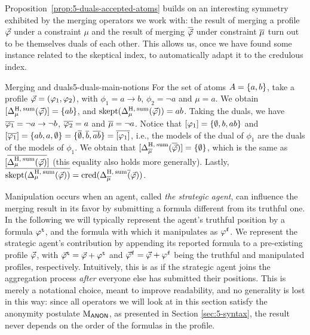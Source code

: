 Proposition~\ref{prop:5-duals-accepted-atoms} builds on an interesting symmetry 
exhibited by the merging operators we work with:
the result of merging a profile $\P$ under a constraint $\mu$ 
and the result of merging $\dual{\P}$ under constraint $\dual{\mu}$ turn out
to be themselves duals of each other. This allows us, once we have found some 
instance related to the skeptical index,
to automatically adapt it to the credulous index. 

\begin{xmpl}{Merging and duals}{5-duals-main-notions}
	For the set of atoms $\Atoms=\set{a,b}$, 
	take a profile $\P=(\phi_1,\phi_2)$, with
	$\phi_1 = {a\rightarrow b}$, $\phi_2=\lnot a$ and $\mu= a$.
	We obtain $\mods{\me_\mu^{\hamming,\:\ssum}(\P)}=\{ab\}$, 
	and $\skept(\me_\mu^{\hamming,\:\ssum}(\P))=ab$.
	Taking the duals, we have $\dual{\phi_1}=\lnot a\rightarrow\lnot b$,
	$\dual{\phi_2}=a$ and $\dual{\mu}=\lnot a$.
	Notice that $\mods{\phi_1}=\set{\emptyset,b,ab}$
	and $\mods{\dual{\phi_1}}=\set{ab,a,\emptyset}=\set{\dual{\emptyset},\dual{b},\dual{ab}}=\dual{\mods{\phi_1}}$,
	i.e., the models of the dual of $\phi_1$ are the duals of the models of $\phi_1$.
	We obtain that $[\me^{\hamming,\:\ssum}_{\dual{\mu}}(\dual{\P})]=\set{\emptyset}$,
	which is the same as $\mods{\dual{\me_\mu^{\hamming,\:\ssum}(\P)}}$ (this equality also holds more generally).
	Lastly, $\dual{\skept(\me_\mu^{\hamming,\:\ssum}(\P))}=\cred(\me^{\hamming,\:\ssum}_{\dual{\mu}}{\dual(\P)})$.
\end{xmpl}

Manipulation occurs when an agent, called \emph{the strategic agent},
can influence the merging result in its favor by submitting a formula different from its truthful one. 
In the following we will typically represent the agent's truthful position by a formula $\truth{\phi}$, 
and the formula with which it manipulates as $\manip{\phi}$.
We represent the strategic agent's contribution by appending 
its reported formula to a pre-existing profile $\P$,
with $\truth{\P}=\P+\truth{\phi}$  
and $\manip{\P} = \P+\manip{\phi}$ 
being the truthful and manipulated profiles, respectively.
Intuitively, this is as if the strategic agent joins the aggregation process 
\emph{after} everyone else has submitted their positions.
This is merely a notational choice, meant to improve readability, and no generality is lost in this way: 
since all operators we will look at in this section satisfy the anonymity postulate $\ppm{\ANON}$,
as presented in Section \ref{sec:5-syntax},
the result never depends on the order of the formulas in the profile. 



